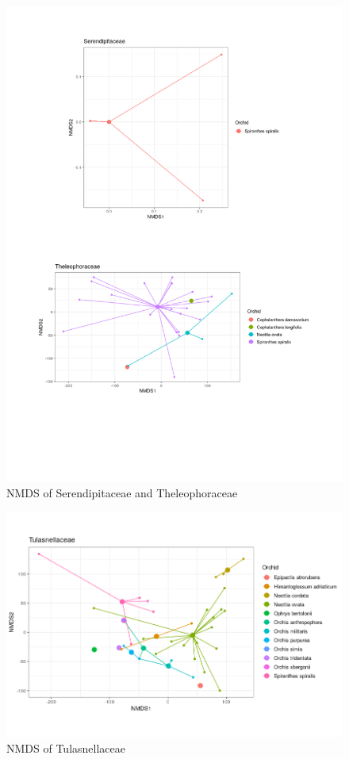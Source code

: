 \begin{figure}[htbp]
\centering
\includegraphics[keepaspectratio,width=\textwidth,height=0.75\textheight]{images/NMDSserthe.png}
\caption{NMDS of Serendipitaceae and Theleophoraceae}
\end{figure}

\begin{figure}[htbp]
\centering
\includegraphics[keepaspectratio,width=\textwidth,height=0.75\textheight]{images/NMDStul.png}
\caption{NMDS of Tulasnellaceae}
\end{figure}

